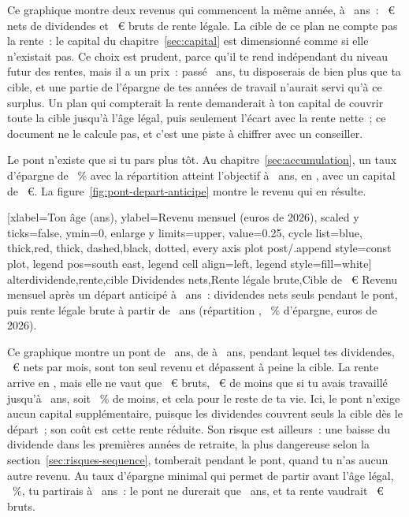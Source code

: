 Ce graphique montre deux revenus qui commencent la m\^eme ann\'ee, \`a \AlterYannBasis~ans~:
\RevenuNetYannBasis~€ nets de dividendes et \RenteBeiZielalter~€ bruts de rente l\'egale.  La cible de ce plan ne compte pas la rente~: le capital du chapitre~\ref{sec:capital}
est dimensionn\'e comme si elle n'existait pas. Ce choix est prudent, parce qu'il te rend
ind\'ependant du niveau futur des rentes, mais il a un prix~: pass\'e \AgeLegal~ans, tu disposerais de
bien plus que ta cible, et une partie de l'\'epargne de tes ann\'ees de travail n'aurait servi qu'\`a
ce surplus. Un plan qui compterait la rente demanderait \`a ton capital de couvrir toute la cible
jusqu'\`a l'\^age l\'egal, puis seulement l'\'ecart avec la rente nette~; ce document ne le calcule
pas, et c'est une piste \`a chiffrer avec un conseiller.

Le pont n'existe que si tu pars plus t\^ot. Au chapitre~\ref{sec:accumulation}, un taux d'\'epargne de
\SparquoteFuenfzig~\% avec la r\'epartition \ReferenzStrategie{} atteint l'objectif \`a
\AlterMaisonSiebzigFuenfzig~ans, en \BrueckeAnneeDebutFuenfzig, avec un capital de
\KapitalBrueckeFuenfzig~€. La figure~\ref{fig:pont-depart-anticipe} montre le revenu qui en r\'esulte.

[xlabel={Ton \^age (ans)}, ylabel={Revenu mensuel (euros de 2026)},
  scaled y ticks=false, ymin=0, enlarge y limits={upper, value=0.25},
  cycle list={{blue, thick},{red, thick, dashed},{black, dotted}},
  every axis plot post/.append style={const plot},
  legend pos=south east, legend cell align=left, legend style={fill=white}]%
  {alter}{dividende,rente,cible}%
  {{Dividendes nets},{Rente l\'egale brute},{Cible de \ZielMonat~€}}%
  {Revenu mensuel apr\`es un d\'epart anticip\'e \`a \AlterMaisonSiebzigFuenfzig~ans~: dividendes nets
  seuls pendant le pont, puis rente l\'egale brute \`a partir de \AgeLegal~ans (r\'epartition
  \ReferenzStrategie, \SparquoteFuenfzig~\% d'\'epargne, euros de 2026).\label{fig:pont-depart-anticipe}}

Ce graphique montre un pont de \BrueckeJahreFuenfzig~ans, de \AlterMaisonSiebzigFuenfzig{} \`a
\AgeLegal~ans, pendant lequel tes dividendes, \RevenuNetBrueckeFuenfzig~€ nets par mois, sont ton
seul revenu et d\'epassent \`a peine la cible. La rente arrive en \BrueckeAnneeRente, mais elle ne
vaut que \RenteBrueckeFuenfzig~€ bruts, \RenteBrueckePerteMois~€ de moins que si tu avais travaill\'e
jusqu'\`a \AgeLegal~ans, soit \RenteBrueckePerteProzent~\% de moins, et cela pour le reste de ta vie.
Ici, le pont n'exige aucun capital suppl\'ementaire, puisque les dividendes couvrent seuls la cible
d\`es le d\'epart~; son co\^ut est cette rente r\'eduite. Son risque est ailleurs~: une baisse du
dividende dans les premi\`eres ann\'ees de retraite, la plus dangereuse selon la
section~\ref{sec:risques-sequence}, tomberait pendant le pont, quand tu n'as aucun autre revenu. Au
taux d'\'epargne minimal qui permet de partir avant l'\^age l\'egal, \QuoteAnticipeeMaisonSiebzig~\%,
tu partirais \`a \AlterAnticipeeMaisonSiebzig~ans~: le pont ne durerait que
\BrueckeJahreAnticipee~ans, et ta rente vaudrait \RenteBrueckeAnticipee~€ bruts.

